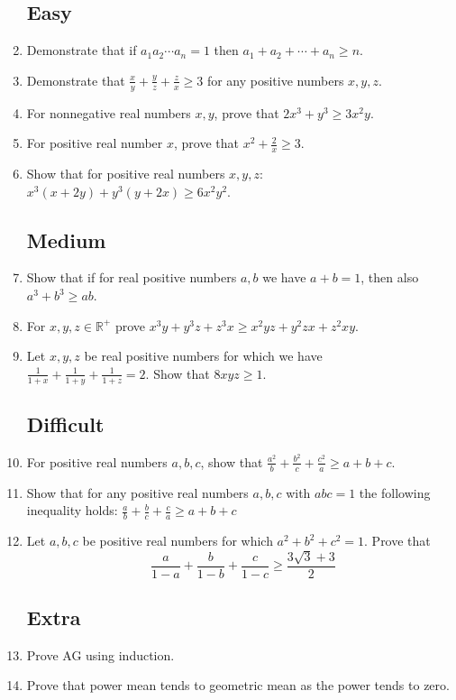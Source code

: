 \documentclass[11pt,a5paper]{article}
\begin{document}
\begin{enumerate}
	\subsection*{Easy}
	\item{Demonstrate that if $a_1a_2\cdots a_n=1$ then 
	$a_1+a_2+\cdots +a_n\ge n$.}

	\item{Demonstrate that $\frac{x}{y} + \frac{y}{z} + \frac{z}{x} \ge 3$  for any positive numbers $x, y, z$.}

	\item{For nonnegative real numbers $x, y$, prove that $2x^3 + y^3 \ge 3x^2y$.}
	\item{For positive real number $x$, prove that $x^2 + \frac{2}{x} \ge 3$.}

	\item{Show that for positive real numbers $x, y, z$: \\ $x^3(x + 2y) + y^3(y + 2x) \ge 6x^2y^2$.}
	\subsection*{Medium}	
	\item{Show that if for real positive numbers $a, b$ we have $a + b = 1$, then also $a^3 + b^3 \ge ab$.}

	\item{For $x, y, z \in \mathbb{R}^{+}$ prove $x^3y + y^3z + z^3x \ge x^2yz + y^2zx + z^2xy$.}
	
	\item{Let $x, y, z$ be real positive numbers for which we have \\ $\frac{1}{1 + x} + \frac{1}{1 + y} + \frac{1}{1+z} = 2$. Show that $8xyz \ge 1$.}
	
	\subsection*{Difficult}
	\item{For positive real numbers $a, b, c$, show that $\frac{a^2}{b} + \frac{b^2}{c} + \frac{c^2}{a} \ge a + b + c$.}

	\item{Show that for any positive real numbers $a, b, c$ with $abc = 1$ 	 the following inequality holds: 
	$\frac{a}{b} + \frac{b}{c} + \frac{c}{a} \ge a + b + c$}

	\item{Let $a, b, c$ be positive real numbers for which $a^2 + b^2 + c^2 = 1$. Prove that \\
	\[\frac{a}{1-a} + \frac{b}{1 - b} + \frac{c}{1 - c} \ge \frac{3\sqrt{3} + 3}{2}\]}

	\subsection*{Extra}	
	\item{Prove AG using induction.}
	
	\item{Prove that power mean tends to geometric mean as the power 
	tends to zero.}
\end{enumerate}
\end{document}
